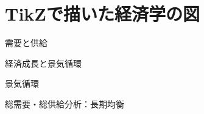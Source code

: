 \documentclass[
  dvipdfmx,               %
  t,                      %
  10pt
]{beamer}
\begin{document}
\begin{frame}[plain]
  \titlepage
\end{frame}

\section{TikZで描いた経済学の図}

\begin{frame}{需要と供給}
  \begin{center}
    
  \end{center}
\end{frame}

%     

%     

\begin{frame}{経済成長と景気循環}
  \begin{center}
    
  \end{center}
\end{frame}

\begin{frame}{景気循環}
  \begin{center}
    
  \end{center}
\end{frame}

\begin{frame}{総需要・総供給分析：長期均衡}
  \begin{center}
    \scalebox{0.8}{}
  \end{center}
\end{frame}
\end{document}
